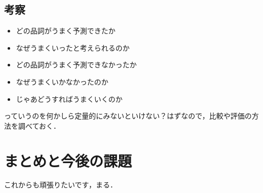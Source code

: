 \documentclass[twocolumn]{jarticle}
\begin{document}
  \subsection{考察}
  \begin{itemize}
    \item どの品詞がうまく予測できたか
    \item なぜうまくいったと考えられるのか
    \item どの品詞がうまく予測できなかったか
    \item なぜうまくいかなかったのか
    \item じゃあどうすればうまくいくのか
  \end{itemize}
  っていうのを何かしら定量的にみないといけない？はずなので，比較や評価の方法を調べておく．


\section{まとめと今後の課題}
これからも頑張りたいです，まる．




\end{document}
